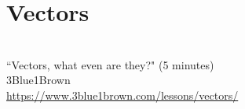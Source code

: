 \section{Vectors}
\begin{bookfigure}
   \\
  ``Vectors, what even are they?" (5 minutes) \\
  \footnotesize 3Blue1Brown \\
  \url{https://www.3blue1brown.com/lessons/vectors/}
\end{bookfigure}
